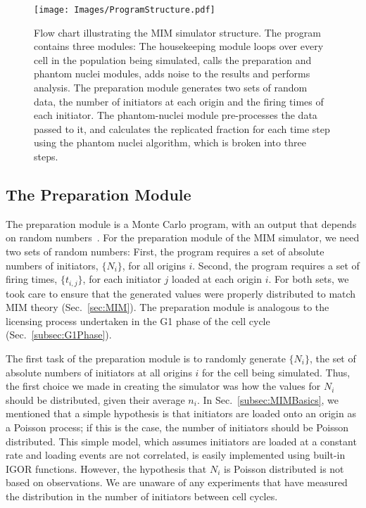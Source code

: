 	\begin{figure}[tbh!]
		\begin{center}
			\texttt{[image: Images/ProgramStructure.pdf]}
		\end{center}
			\caption[MIM Simulator Program Structure]{\label{fig:ProgramStructure} 
				Flow chart illustrating the MIM simulator structure.
				The program contains three modules: 
				The housekeeping module loops over every cell in the population being simulated, calls the preparation and phantom nuclei modules, adds noise to the results and performs analysis.
				The preparation module generates two sets of random data, the number of initiators at each origin and the firing times of each initiator.
				The phantom-nuclei module pre-processes the data passed to it, and calculates the replicated fraction for each time step using the phantom nuclei algorithm, which is broken into three steps.
			}
	\end{figure}
	
	
		\subsection{The Preparation Module}
		\label{subsec:PrepModule}
		
		The preparation module is a Monte Carlo program, with an output that depends on random numbers~\cite{CompPhys}.
		For the preparation module of the MIM simulator,  we need two sets of random numbers:
		First, the program requires a set of absolute numbers of initiators, $\{N_i\}$, for all origins $i$.
		Second, the program requires a set of firing times, $\{t_{i,j}\}$, for each initiator $j$ loaded at each origin $i$.
		For both sets, we took care to ensure that the generated values were properly distributed to match MIM theory (Sec.~\ref{sec:MIM}).
		The preparation module is analogous to the licensing process undertaken in the G1 phase of the cell cycle (Sec.~\ref{subsec:G1Phase}).
			
		The first task of the preparation module is to randomly generate $\{N_i\}$, the set of absolute numbers of initiators at all origins $i$ for the cell being simulated.
		Thus, the first choice we made in creating the simulator was how the values for $N_i$ should be distributed, given their average $n_i$.
		In Sec.~\ref{subsec:MIMBasics}, we mentioned that a simple hypothesis is that initiators are loaded onto an origin as a Poisson process; if this is the case, the number of initiators should be Poisson distributed.
		This simple model, which assumes initiators are loaded at a constant rate and loading events are not correlated, is easily implemented using built-in IGOR functions.
		However, the hypothesis that $N_i$ is Poisson distributed is not based on observations.
		We are unaware of any experiments that have measured the distribution in the number of initiators between cell cycles.
		
